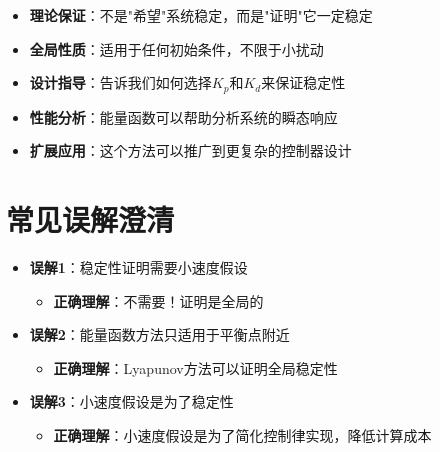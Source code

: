 \documentclass{article}
\begin{document}
\begin{itemize}
\item \textbf{理论保证}：不是"希望"系统稳定，而是"证明"它一定稳定
\item \textbf{全局性质}：适用于任何初始条件，不限于小扰动
\item \textbf{设计指导}：告诉我们如何选择$K_p$和$K_d$来保证稳定性
\item \textbf{性能分析}：能量函数可以帮助分析系统的瞬态响应
\item \textbf{扩展应用}：这个方法可以推广到更复杂的控制器设计
\end{itemize}

\section{常见误解澄清}

\begin{itemize}
\item \textbf{误解1}：稳定性证明需要小速度假设
  \begin{itemize}
  \item \textbf{正确理解}：不需要！证明是全局的
  \end{itemize}

\item \textbf{误解2}：能量函数方法只适用于平衡点附近
  \begin{itemize}
  \item \textbf{正确理解}：Lyapunov方法可以证明全局稳定性
  \end{itemize}

\item \textbf{误解3}：小速度假设是为了稳定性
  \begin{itemize}
  \item \textbf{正确理解}：小速度假设是为了简化控制律实现，降低计算成本
  \end{itemize}
\end{itemize}
\end{document}
